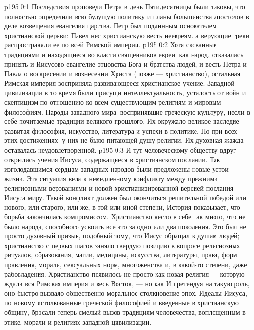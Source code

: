 \author{Комиссия срединников}
\vs p195 0:1 Последствия проповеди Петра в день Пятидесятницы были таковы, что полностью определили всю будущую политику и планы большинства апостолов в деле возвещения евангелия царства. Петр был подлинным основателем христианской церкви; Павел нес христианскую весть неевреям, а верующие греки распространяли ее по всей Римской империи.
\vs p195 0:2 Хотя скованные традициями и находящиеся во власти священников евреи, как народ, отказались принять и Иисусово евангелие отцовства Бога и братства людей, и весть Петра и Павла о воскресении и вознесении Христа (позже --- христианство), остальная Римская империя восприняла развивающееся христианское учение. Западной цивилизации в то время были присущи интеллектуальность, усталость от войн и скептицизм по отношению ко всем существующим религиям и мировым философиям. Народы западного мира, воспринявшие греческую культуру, несли в себе почитаемые традиции великого прошлого. Их окружало великое наследие --- развитая философия, искусство, литература и успехи в политике. Но при всех этих достижениях, у них не было питающей душу религии. Их духовная жажда оставалась неудовлетворенной.
\vs p195 0:3 И тут человеческому обществу вдруг открылись учения Иисуса, содержащиеся в христианском послании. Так изголодавшимся сердцам западных народов были предложены новые устои жизни. Эта ситуация вела к немедленному конфликту между прежними религиозными верованиями и новой христианизированной версией послания Иисуса миру. Такой конфликт должен был окончиться решительной победой или нового, или старого, или же, в той или иной степени,  История показывает, что борьба закончилась компромиссом. Христианство несло в себе так много, что не было народа, способного усвоить все это за одно или два поколения. Это был не просто духовный призыв, подобный тому, что Иисус обращал к душам людей; христианство с первых шагов заняло твердую позицию в вопросе религиозных ритуалов, образования, магии, медицины, искусства, литературы, права, форм правления, морали, сексуальных норм, многоженства и, в какой\hyp{}то степени, даже рабовладения. Христианство появилось не просто как новая религия --- которую ждали вся Римская империя и весь Восток, --- но как  И претендуя на такую роль, оно быстро вызвало общественно\hyp{}моральное столкновение эпох. Идеалы Иисуса, по новому истолкованные греческой философией и введенные в христианскую общину, бросали теперь смелый вызов традициям человечества, воплощенным в этике, морали и религиях западной цивилизации.
